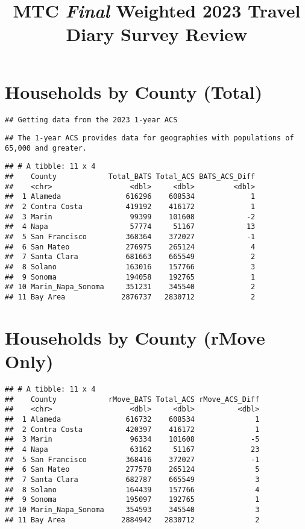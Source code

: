 \documentclass[
]{article}
\title{MTC \emph{Final} Weighted 2023 Travel Diary Survey Review}
\author{}
\date{\vspace{-2.5em}}
\begin{document}
\maketitle

{
\setcounter{tocdepth}{2}
\tableofcontents
}
\section{Households by County (Total)}\label{households-by-county-total}

\begin{verbatim}
## Getting data from the 2023 1-year ACS
\end{verbatim}

\begin{verbatim}
## The 1-year ACS provides data for geographies with populations of 65,000 and greater.
\end{verbatim}

\begin{verbatim}
## # A tibble: 11 x 4
##    County            Total_BATS Total_ACS BATS_ACS_Diff
##    <chr>                  <dbl>     <dbl>         <dbl>
##  1 Alameda               616296    608534             1
##  2 Contra Costa          419192    416172             1
##  3 Marin                  99399    101608            -2
##  4 Napa                   57774     51167            13
##  5 San Francisco         368364    372027            -1
##  6 San Mateo             276975    265124             4
##  7 Santa Clara           681663    665549             2
##  8 Solano                163016    157766             3
##  9 Sonoma                194058    192765             1
## 10 Marin_Napa_Sonoma     351231    345540             2
## 11 Bay Area             2876737   2830712             2
\end{verbatim}

\section{Households by County (rMove
Only)}\label{households-by-county-rmove-only}

\begin{verbatim}
## # A tibble: 11 x 4
##    County            rMove_BATS Total_ACS rMove_ACS_Diff
##    <chr>                  <dbl>     <dbl>          <dbl>
##  1 Alameda               616732    608534              1
##  2 Contra Costa          420397    416172              1
##  3 Marin                  96334    101608             -5
##  4 Napa                   63162     51167             23
##  5 San Francisco         368416    372027             -1
##  6 San Mateo             277578    265124              5
##  7 Santa Clara           682787    665549              3
##  8 Solano                164439    157766              4
##  9 Sonoma                195097    192765              1
## 10 Marin_Napa_Sonoma     354593    345540              3
## 11 Bay Area             2884942   2830712              2
\end{verbatim}
\end{document}
